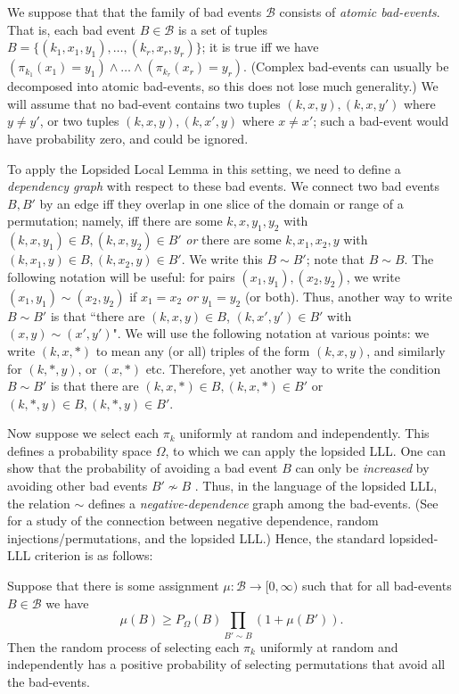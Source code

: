 We suppose that that the family of bad events $\mathcal B$ consists of \emph{atomic bad-events}. That is, each bad event $B \in \mathcal B$ is a set of tuples $B = \{(k_1, x_1, y_1), \dots, (k_r, x_r, y_r)\}$; it is true iff we have $(\pi_{k_1} (x_1) = y_1) \wedge \dots \wedge (\pi_{k_r} (x_r) = y_r)$. (Complex bad-events can usually be decomposed into atomic bad-events, so this does not lose much generality.) We will assume that no bad-event contains two tuples $(k, x,y), (k,x,y')$ where $y \neq y'$, or two tuples $(k,x,y), (k,x',y)$ where $x \neq x'$; such a bad-event would have probability zero, and could be ignored.

To apply the Lopsided Local Lemma in this setting, we need to define a \emph{dependency graph} with respect to these bad events. We connect two bad events $B, B'$ by an edge iff they overlap in one slice of the domain or range of a permutation; namely, iff there are some $k, x, y_1, y_2$ with $(k, x, y_1) \in B, (k, x, y_2) \in B'$ \emph{or} there are some $k, x_1, x_2, y$ with $(k, x_1, y) \in B, (k, x_2, y) \in B'$.  We write this $B \sim B'$; note that $B \sim B$. 
The following notation will be useful: for pairs $(x_1, y_1), (x_2, y_2)$, we write $(x_1, y_1) \sim (x_2, y_2)$ if $x_1 = x_2$ \emph{or} $y_1 = y_2$ (or both). Thus, another way to write $B \sim B'$ is that ``there are $(k,x,y) \in B$, $(k, x', y') \in B'$ with $(x,y) \sim (x', y')$".
We will use the following notation at various points: we write $(k,x,*)$ to mean any (or all) triples of the form $(k,x,y)$, and similarly for $(k,*,y)$, or $(x,*)$ etc. Therefore, yet another way to write the condition $B \sim B'$ is that there are $(k,x,*) \in B, (k,x,*) \in B'$ or $(k,*,y) \in B, (k,*,y) \in B'$.

Now suppose we select each $\pi_k$ uniformly at random and independently. This defines a probability space $\Omega$, to which we can apply the lopsided LLL. One can show that the probability of avoiding a bad event $B$ can only be \emph{increased} by avoiding other bad events $B' \not \sim B$ \cite{random-inj}. Thus, in the language of the lopsided LLL, the relation $\sim$ defines a \emph{negative-dependence} graph among the bad-events. 
(See \cite{lu,random-inj,mohr} for a study of the connection between negative dependence, random injections/permutations, and the lopsided LLL.)
Hence, the standard lopsided-LLL criterion is as follows:
\begin{theorem}
\label{thm:lopsided}
Suppose that there is some assignment $\mu : \mathcal B \rightarrow \mathbf [0, \infty)$ such that for all bad-events $B \in \mathcal B$ we have
$$
\mu(B) \geq P_{\Omega}(B) \prod_{B' \sim B} (1 + \mu(B')).
$$
Then the random process of selecting each $\pi_k$ uniformly at random and independently has a positive probability of selecting permutations that avoid all the bad-events.
\end{theorem}

